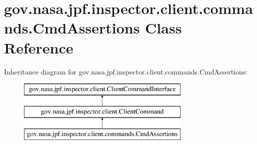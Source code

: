 \hypertarget{classgov_1_1nasa_1_1jpf_1_1inspector_1_1client_1_1commands_1_1_cmd_assertions}{}\section{gov.\+nasa.\+jpf.\+inspector.\+client.\+commands.\+Cmd\+Assertions Class Reference}
\label{classgov_1_1nasa_1_1jpf_1_1inspector_1_1client_1_1commands_1_1_cmd_assertions}
Inheritance diagram for gov.\+nasa.\+jpf.\+inspector.\+client.\+commands.\+Cmd\+Assertions\+:\begin{figure}[H]
\begin{center}
\leavevmode
\includegraphics[height=3.000000cm]{classgov_1_1nasa_1_1jpf_1_1inspector_1_1client_1_1commands_1_1_cmd_assertions}
\end{center}
\end{figure}
